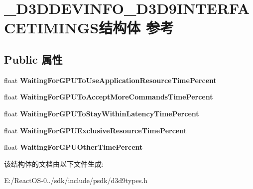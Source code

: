 \hypertarget{struct___d3_d_d_e_v_i_n_f_o___d3_d9_i_n_t_e_r_f_a_c_e_t_i_m_i_n_g_s}{}\section{\+\_\+\+D3\+D\+D\+E\+V\+I\+N\+F\+O\+\_\+\+D3\+D9\+I\+N\+T\+E\+R\+F\+A\+C\+E\+T\+I\+M\+I\+N\+G\+S结构体 参考}
\label{struct___d3_d_d_e_v_i_n_f_o___d3_d9_i_n_t_e_r_f_a_c_e_t_i_m_i_n_g_s}
\subsection*{Public 属性}
\begin{DoxyCompactItemize}
\item 
\mbox{\label{struct___d3_d_d_e_v_i_n_f_o___d3_d9_i_n_t_e_r_f_a_c_e_t_i_m_i_n_g_s_a718c044181cd08dca950a17e48b6af10}} 
float {\bfseries Waiting\+For\+G\+P\+U\+To\+Use\+Application\+Resource\+Time\+Percent}
\item 
\mbox{\label{struct___d3_d_d_e_v_i_n_f_o___d3_d9_i_n_t_e_r_f_a_c_e_t_i_m_i_n_g_s_a08fd4df07ced39bebf08e2a8ab58f43a}} 
float {\bfseries Waiting\+For\+G\+P\+U\+To\+Accept\+More\+Commands\+Time\+Percent}
\item 
\mbox{\label{struct___d3_d_d_e_v_i_n_f_o___d3_d9_i_n_t_e_r_f_a_c_e_t_i_m_i_n_g_s_ae6bb3a7851712209bb1072d06322da5a}} 
float {\bfseries Waiting\+For\+G\+P\+U\+To\+Stay\+Within\+Latency\+Time\+Percent}
\item 
\mbox{\label{struct___d3_d_d_e_v_i_n_f_o___d3_d9_i_n_t_e_r_f_a_c_e_t_i_m_i_n_g_s_a72aac65a6e6a8602d8581fa8a5925048}} 
float {\bfseries Waiting\+For\+G\+P\+U\+Exclusive\+Resource\+Time\+Percent}
\item 
\mbox{\label{struct___d3_d_d_e_v_i_n_f_o___d3_d9_i_n_t_e_r_f_a_c_e_t_i_m_i_n_g_s_a01e7b7ff300eb678ada931e5d3d362eb}} 
float {\bfseries Waiting\+For\+G\+P\+U\+Other\+Time\+Percent}
\end{DoxyCompactItemize}


该结构体的文档由以下文件生成\+:\begin{DoxyCompactItemize}
\item 
E\+:/\+React\+O\+S-\/0../sdk/include/psdk/d3d9types.\+h\end{DoxyCompactItemize}
